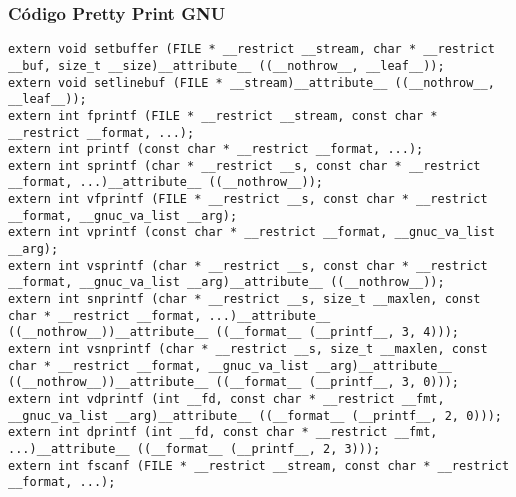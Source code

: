 \documentclass{beamer}
\begin{document}
\begin{frame}[fragile]
\frametitle{C\'odigo Pretty Print GNU}
\begin{verbatim}
extern void setbuffer (FILE * __restrict __stream, char * __restrict __buf, size_t __size)__attribute__ ((__nothrow__, __leaf__));
extern void setlinebuf (FILE * __stream)__attribute__ ((__nothrow__, __leaf__));
extern int fprintf (FILE * __restrict __stream, const char * __restrict __format, ...);
extern int printf (const char * __restrict __format, ...);
extern int sprintf (char * __restrict __s, const char * __restrict __format, ...)__attribute__ ((__nothrow__));
extern int vfprintf (FILE * __restrict __s, const char * __restrict __format, __gnuc_va_list __arg);
extern int vprintf (const char * __restrict __format, __gnuc_va_list __arg);
extern int vsprintf (char * __restrict __s, const char * __restrict __format, __gnuc_va_list __arg)__attribute__ ((__nothrow__));
extern int snprintf (char * __restrict __s, size_t __maxlen, const char * __restrict __format, ...)__attribute__ ((__nothrow__))__attribute__ ((__format__ (__printf__, 3, 4)));
extern int vsnprintf (char * __restrict __s, size_t __maxlen, const char * __restrict __format, __gnuc_va_list __arg)__attribute__ ((__nothrow__))__attribute__ ((__format__ (__printf__, 3, 0)));
extern int vdprintf (int __fd, const char * __restrict __fmt, __gnuc_va_list __arg)__attribute__ ((__format__ (__printf__, 2, 0)));
extern int dprintf (int __fd, const char * __restrict __fmt, ...)__attribute__ ((__format__ (__printf__, 2, 3)));
extern int fscanf (FILE * __restrict __stream, const char * __restrict __format, ...);
\end{verbatim}
\end{frame}
\end{document}
